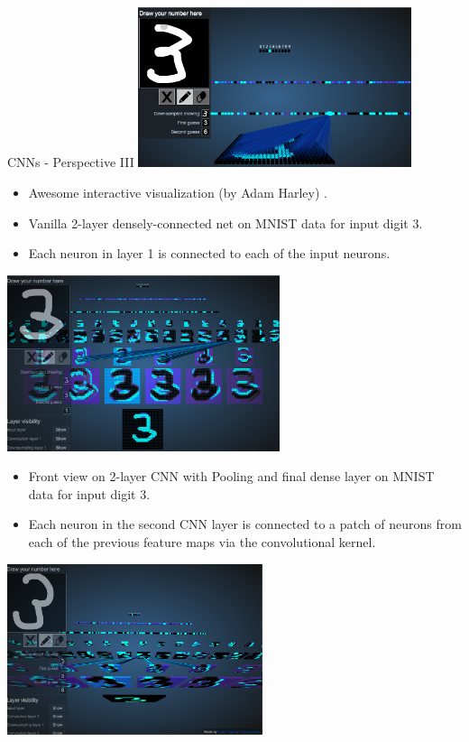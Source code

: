 \begin{vbframe}{CNNs - Perspective III}
\center
\includegraphics[width=8cm]{figure/3dviz_fcn.png}
\begin{itemize}
\item Awesome interactive visualization (by Adam Harley)  \href{http://scs.ryerson.ca/~aharley/vis/}{}.
\item Vanilla 2-layer densely-connected net on MNIST data for input digit $3$.
\item Each neuron in layer 1 is connected to each of the input neurons.
\end{itemize}
\framebreak
\center
\includegraphics[width=8cm]{figure/3dviz_cnn_front.png}
\begin{itemize}
\item Front view on 2-layer CNN with Pooling and final dense layer on MNIST data for input digit $3$.
\item Each neuron in the second CNN layer is connected to a patch of neurons from each of the previous feature maps via the convolutional kernel.
\end{itemize}
\framebreak
\center
\includegraphics[width=7.5cm]{figure/3dviz_cnn_bottom.png}

\end{vbframe}
